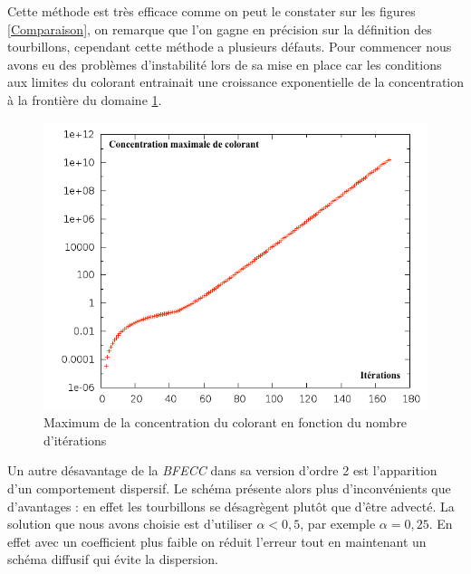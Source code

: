 		Cette méthode est très efficace comme on peut le constater sur les figures \ref{Comparaison}, on remarque que l'on gagne en précision sur la définition des tourbillons, cependant cette méthode a plusieurs défauts. Pour commencer nous avons eu des problèmes d'instabilité lors de sa mise en place car les conditions aux limites du colorant entrainait une croissance exponentielle de la concentration à la frontière du domaine \ref{instabilite}.
		
		\begin{figure}[htbp]
			\begin{center}
			\includegraphics[width=0.7 \textwidth]{instabilite.png}
			\caption{Maximum de la concentration du colorant en fonction du nombre d'itérations}
			\label{instabilite}
			\end{center}
		\end{figure}
		
		Un autre désavantage de la \emph{BFECC} dans sa version d'ordre 2 est l'apparition d'un comportement dispersif. Le schéma présente alors plus d'inconvénients que d'avantages : en effet les tourbillons se désagrègent plutôt que d'être advecté. La solution que nous avons choisie est d'utiliser $\alpha < 0,5$, par exemple $\alpha = 0,25$. En effet avec un coefficient plus faible on réduit l'erreur tout en maintenant un schéma diffusif qui évite la dispersion.
		
